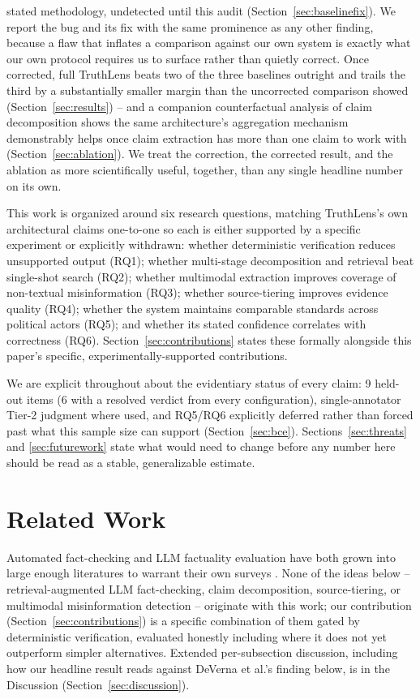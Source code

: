 \documentclass[conference]{IEEEtran}
\begin{document}
stated methodology, undetected until this audit
(Section~\ref{sec:baselinefix}). We report the bug and its fix with the
same prominence as any other finding, because a flaw that inflates a
comparison against our own system is exactly what our own protocol
requires us to surface rather than quietly correct. Once corrected, full
TruthLens beats two of the three baselines outright and trails the third
by a substantially smaller margin than the uncorrected comparison showed
(Section~\ref{sec:results}) -- and a companion counterfactual analysis of
claim decomposition shows the same architecture's aggregation mechanism
demonstrably helps once claim extraction has more than one claim to work
with (Section~\ref{sec:ablation}). We treat the correction, the corrected
result, and the ablation as more scientifically useful, together, than
any single headline number on its own.

This work is organized around six research questions, matching
TruthLens's own architectural claims one-to-one so each is either
supported by a specific experiment or explicitly withdrawn: whether
deterministic verification reduces unsupported output (RQ1); whether
multi-stage decomposition and retrieval beat single-shot search (RQ2);
whether multimodal extraction improves coverage of non-textual
misinformation (RQ3); whether source-tiering improves evidence quality
(RQ4); whether the system maintains comparable standards across political
actors (RQ5); and whether its stated confidence correlates with
correctness (RQ6). Section~\ref{sec:contributions} states these formally
alongside this paper's specific, experimentally-supported contributions.

We are explicit throughout about the evidentiary status of every claim: 9
held-out items (6 with a resolved verdict from every configuration),
single-annotator Tier-2 judgment where used, and RQ5/RQ6 explicitly
deferred rather than forced past what this sample size can support
(Section~\ref{sec:bce}). Sections~\ref{sec:threats} and
\ref{sec:futurework} state what would need to change before any number
here should be read as a stable, generalizable estimate.

\section{Related Work}
\label{sec:relatedwork}

Automated fact-checking and LLM factuality evaluation have both grown into
large enough literatures to warrant their own surveys
\cite{rahman2025hallucinationtotruth,vykopal2024genaisurvey}. None of the
ideas below -- retrieval-augmented LLM fact-checking, claim decomposition,
source-tiering, or multimodal misinformation detection -- originate with
this work; our contribution (Section~\ref{sec:contributions}) is a
specific combination of them gated by deterministic verification,
evaluated honestly including where it does not yet outperform simpler
alternatives. Extended per-subsection discussion, including how our
headline result reads against DeVerna et al.'s finding below, is in the
Discussion (Section~\ref{sec:discussion}).
\end{document}
